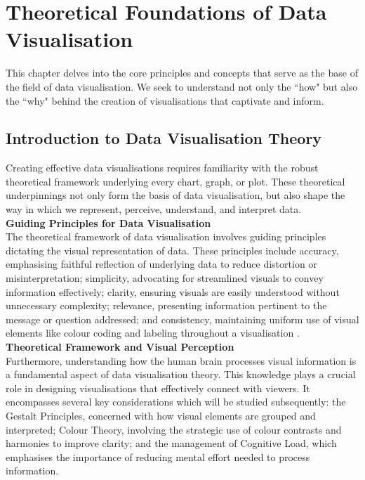 \documentclass{article}\usepackage[]{graphicx}\usepackage[]{xcolor}
\numberwithin{equation}{section}
\begin{document}
\newpage 

\section{Theoretical Foundations of Data Visualisation}
\noindent This chapter delves into the core principles and concepts that serve as the base of the field of data visualisation. We seek to understand not only the ``how" but also the ``why" behind the creation of visualisations that captivate and inform.

\subsection{Introduction to Data Visualisation Theory}
Creating effective data visualisations requires familiarity with the robust theoretical framework underlying every chart, graph, or plot. These theoretical underpinnings not only form the basis of data visualisation, but also shape the way in which we represent, perceive, understand, and interpret data.\\ 

\noindent \textbf{Guiding Principles for Data Visualisation}\\
The theoretical framework of data visualisation involves guiding principles dictating the visual representation of data. These principles include accuracy, emphasising faithful reflection of underlying data to reduce distortion or misinterpretation; simplicity, advocating for streamlined visuals to convey information effectively; clarity, ensuring visuals are easily understood without unnecessary complexity; relevance, presenting information pertinent to the message or question addressed; and consistency, maintaining uniform use of visual elements like colour coding and labeling throughout a visualisation \cite{grant2018data}.\\

\noindent \textbf{Theoretical Framework and Visual Perception}\\
Furthermore, understanding how the human brain processes visual information is a fundamental aspect of data visualisation theory. This knowledge plays a crucial role in designing visualisations that effectively connect with viewers. It encompasses several key considerations which will be studied subsequently: the Gestalt Principles, concerned with how visual elements are grouped and interpreted; Colour Theory, involving the strategic use of colour contrasts and harmonies to improve clarity; and the management of Cognitive Load, which emphasises the importance of reducing mental effort needed to process information.
\end{document}
